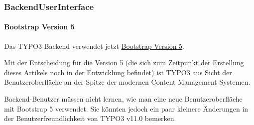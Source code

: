 %

\begin{frame}[fragile]
	\frametitle{BackendUserInterface}
	\framesubtitle{Bootstrap Version 5}

	Das TYPO3-Backend verwendet jetzt
	\href{https://getbootstrap.com/}{Bootstrap Version 5}.

	\vspace{0.2cm}

	Mit der Entscheidung für die Version 5 (die sich zum Zeitpunkt der Erstellung dieses
	Artikels noch in der Entwicklung befindet) ist TYPO3 aus Sicht der Benutzeroberfläche an
	der Spitze der modernen Content Management Systemen.

	\vspace{0.2cm}

	Backend-Benutzer müssen nicht lernen, wie man eine neue Benutzeroberfläche mit
	Bootstrap 5 verwendet. Sie könnten jedoch ein paar kleinere Änderungen in der Benutzerfreundlichkeit
	von TYPO3 v11.0 bemerken.

\end{frame}


